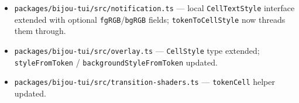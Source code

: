 \begin{itemize}
\tightlist
\item
  \texttt{p\allowbreak{}a\allowbreak{}c\allowbreak{}k\allowbreak{}a\allowbreak{}g\allowbreak{}e\allowbreak{}s\allowbreak{}/\allowbreak{}b\allowbreak{}i\allowbreak{}j\allowbreak{}o\allowbreak{}u\allowbreak{}-\allowbreak{}t\allowbreak{}u\allowbreak{}i\allowbreak{}/\allowbreak{}s\allowbreak{}r\allowbreak{}c\allowbreak{}/\allowbreak{}n\allowbreak{}o\allowbreak{}t\allowbreak{}i\allowbreak{}f\allowbreak{}i\allowbreak{}c\allowbreak{}a\allowbreak{}t\allowbreak{}i\allowbreak{}o\allowbreak{}n\allowbreak{}.\allowbreak{}t\allowbreak{}s} --- local \texttt{C\allowbreak{}e\allowbreak{}l\allowbreak{}l\allowbreak{}T\allowbreak{}e\allowbreak{}x\allowbreak{}t\allowbreak{}S\allowbreak{}t\allowbreak{}y\allowbreak{}l\allowbreak{}e} interface extended with optional \texttt{f\allowbreak{}g\allowbreak{}R\allowbreak{}G\allowbreak{}B}/\texttt{b\allowbreak{}g\allowbreak{}R\allowbreak{}G\allowbreak{}B} fields; \texttt{t\allowbreak{}o\allowbreak{}k\allowbreak{}e\allowbreak{}n\allowbreak{}T\allowbreak{}o\allowbreak{}C\allowbreak{}e\allowbreak{}l\allowbreak{}l\allowbreak{}S\allowbreak{}t\allowbreak{}y\allowbreak{}l\allowbreak{}e} now threads them through.
\item
  \texttt{p\allowbreak{}a\allowbreak{}c\allowbreak{}k\allowbreak{}a\allowbreak{}g\allowbreak{}e\allowbreak{}s\allowbreak{}/\allowbreak{}b\allowbreak{}i\allowbreak{}j\allowbreak{}o\allowbreak{}u\allowbreak{}-\allowbreak{}t\allowbreak{}u\allowbreak{}i\allowbreak{}/\allowbreak{}s\allowbreak{}r\allowbreak{}c\allowbreak{}/\allowbreak{}o\allowbreak{}v\allowbreak{}e\allowbreak{}r\allowbreak{}l\allowbreak{}a\allowbreak{}y\allowbreak{}.\allowbreak{}t\allowbreak{}s} --- \texttt{C\allowbreak{}e\allowbreak{}l\allowbreak{}l\allowbreak{}S\allowbreak{}t\allowbreak{}y\allowbreak{}l\allowbreak{}e} type extended; \texttt{s\allowbreak{}t\allowbreak{}y\allowbreak{}l\allowbreak{}e\allowbreak{}F\allowbreak{}r\allowbreak{}o\allowbreak{}m\allowbreak{}T\allowbreak{}o\allowbreak{}k\allowbreak{}e\allowbreak{}n} / \texttt{b\allowbreak{}a\allowbreak{}c\allowbreak{}k\allowbreak{}g\allowbreak{}r\allowbreak{}o\allowbreak{}u\allowbreak{}n\allowbreak{}d\allowbreak{}S\allowbreak{}t\allowbreak{}y\allowbreak{}l\allowbreak{}e\allowbreak{}F\allowbreak{}r\allowbreak{}o\allowbreak{}m\allowbreak{}T\allowbreak{}o\allowbreak{}k\allowbreak{}e\allowbreak{}n} updated.
\item
  \texttt{p\allowbreak{}a\allowbreak{}c\allowbreak{}k\allowbreak{}a\allowbreak{}g\allowbreak{}e\allowbreak{}s\allowbreak{}/\allowbreak{}b\allowbreak{}i\allowbreak{}j\allowbreak{}o\allowbreak{}u\allowbreak{}-\allowbreak{}t\allowbreak{}u\allowbreak{}i\allowbreak{}/\allowbreak{}s\allowbreak{}r\allowbreak{}c\allowbreak{}/\allowbreak{}t\allowbreak{}r\allowbreak{}a\allowbreak{}n\allowbreak{}s\allowbreak{}i\allowbreak{}t\allowbreak{}i\allowbreak{}o\allowbreak{}n\allowbreak{}-\allowbreak{}s\allowbreak{}h\allowbreak{}a\allowbreak{}d\allowbreak{}e\allowbreak{}r\allowbreak{}s\allowbreak{}.\allowbreak{}t\allowbreak{}s} --- \texttt{t\allowbreak{}o\allowbreak{}k\allowbreak{}e\allowbreak{}n\allowbreak{}C\allowbreak{}e\allowbreak{}l\allowbreak{}l} helper updated.

\end{itemize}
